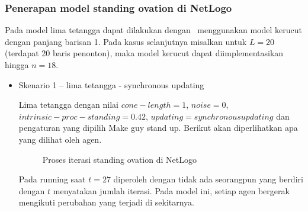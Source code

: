 \subsubsection{Penerapan model standing ovation di NetLogo}

Pada model lima tetangga dapat dilakukan dengan  menggunakan model kerucut dengan panjang barisan 1. Pada kasus selanjutnya misalkan untuk $L=20$ (terdapat 20 baris penonton), maka model kerucut dapat diimplementasikan hingga $n=18$.


\begin{itemize}
	\item Skenario 1 – lima tetangga - synchronous updating

	Lima tetangga dengan nilai $cone-length=1$, $noise=0$, $intrinsic-proc-standing=0.42$, $updating=synchronous updating$ dan pengaturan yang dipilih Make guy stand up. Berikut akan diperlihatkan apa yang dilihat oleh agen.

	\begin{figure}[H]
		\centering
		\hfill
		\hfill
		\hfill
		\caption{Proses iterasi standing ovation di NetLogo}
		\label{fig:proses_sop}
	\end{figure}

	Pada running saat $t=27$ diperoleh dengan tidak ada seorangpun yang berdiri dengan $t$ menyatakan jumlah iterasi. Pada model ini, setiap agen bergerak mengikuti perubahan yang terjadi di sekitarnya.
\end{itemize}
